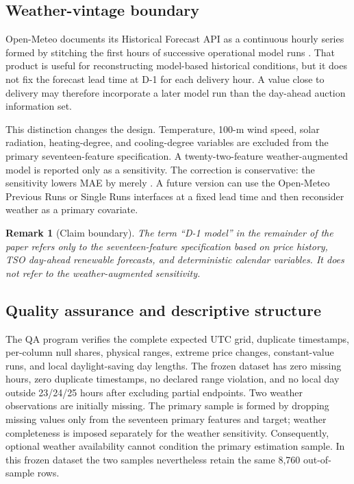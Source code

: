 \documentclass[11pt]{article}
\newtheorem{remark}{Remark}
\begin{document}
\subsection{Weather-vintage boundary}

Open-Meteo documents its Historical Forecast API as a continuous hourly
series formed by stitching the first hours of successive operational model
runs \cite{openmeteo}.  That product is useful for reconstructing model-based
historical conditions, but it does not fix the forecast lead time at D-1 for
each delivery hour.  A value close to delivery may therefore incorporate a
later model run than the day-ahead auction information set.

This distinction changes the design.  Temperature, 100-m wind speed, solar
radiation, heating-degree, and cooling-degree variables are excluded from the
primary seventeen-feature specification.  A twenty-two-feature
weather-augmented model is reported only as a sensitivity.  The correction is
conservative: the sensitivity lowers MAE by merely \WeatherDelta{}.  A future
version can use the Open-Meteo Previous Runs or Single Runs interfaces at a
fixed lead time and then reconsider weather as a primary covariate.

\begin{remark}[Claim boundary]
The term ``D-1 model'' in the remainder of the paper refers only to the
seventeen-feature specification based on price history, TSO day-ahead
renewable forecasts, and deterministic calendar variables.  It does not refer
to the weather-augmented sensitivity.
\end{remark}

\subsection{Quality assurance and descriptive structure}

The QA program verifies the complete expected UTC grid, duplicate timestamps,
per-column null shares, physical ranges, extreme price changes, constant-value
runs, and local daylight-saving day lengths.  The frozen dataset has zero
missing hours, zero duplicate timestamps, no declared range violation, and no
local day outside 23/24/25 hours after excluding partial endpoints.  Two
weather observations are initially missing. The primary sample is formed by
dropping missing values only from the seventeen primary features and target;
weather completeness is imposed separately for the weather sensitivity.
Consequently, optional weather availability cannot condition the primary
estimation sample. In this frozen dataset the two samples nevertheless retain
the same 8,760 out-of-sample rows.
\end{document}
